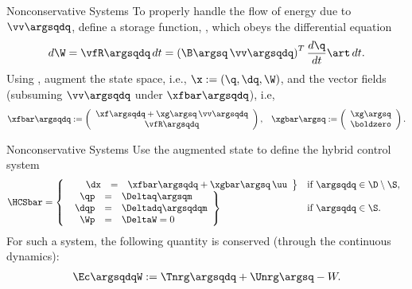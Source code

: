 \begin{frame}[t]
   {
    \begin{block}{Nonconservative Systems}
      To properly handle the flow of energy due to $\vv\argsqdq$, define a storage
      function, \W, which obeys the differential equation
      \begin{align*}
        d\W = \vfR\argsqdq \, dt = \left( \B\argsq \, \vv\argsqdq \right)^{T}
        \frac{d\q}{dt}\art \, dt.
      \end{align*}
      Using \W, augment the state space, i.e., $\x := (\q, \dq, \W)$, and the vector
      fields (subsuming $\vv\argsqdq$ under $\xfbar\argsqdq$), i.e, 
      \begin{align*}
        \xfbar\argsqdq := \left(\begin{array}{c}
            \xf\argsqdq + \xg\argsq \, \vv\argsqdq\\
            \vfR\argsqdq
          \end{array}\right), &&
        \xgbar\argsq := \left(\begin{array}{c}
            \xg\argsq\\
            \boldzero
          \end{array}\right).
      \end{align*}
    \end{block}
  }
   {
    \begin{block}{Nonconservative Systems}
      Use the augmented state to define the hybrid control system
      \begin{align*}
        \HCSbar = \left\{
          \begin{array}{l l}
            \left.\begin{array}{r c l}
                \hspace{1.15em}\dx &=& \xfbar\argsqdq + \xgbar\argsq \, \uu
              \end{array}\right\}  & \mbox{if } \argsqdq \in \D \setminus \S,\\
            \left. \begin{array}{r c l}
                \qp &=& \Deltaq\argsqm\\
                \dqp &=& \Deltadq\argsqdqm\\
                \Wp &=& \DeltaW = 0
              \end{array} \right\} & \mbox{if } \argsqdq \in \S.
          \end{array}\right.
      \end{align*}
      For such a system, the following quantity is conserved (through the
      continuous dynamics):
      \begin{align*}
        \Ec\argsqdqW := \Tnrg\argsqdq + \Unrg\argsq - W.
      \end{align*}
    \end{block}
  }
\end{frame}

